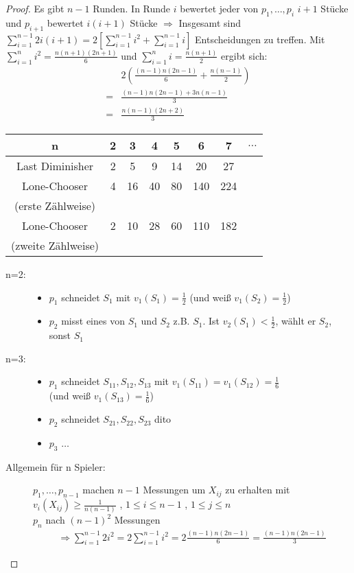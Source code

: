 \documentclass[a4paper,10pt]{scrartcl}
\begin{document}
\begin{proof}
 Es gibt $n-1$ Runden. In Runde $i$ bewertet jeder von $p_1,\ldots,p_i$ $i+1$ Stücke und $p_{i+1}$ bewertet $i(i+1)$ Stücke $\Rightarrow$
 Insgesamt sind $\sum\limits_{i=1}^{n-1}2i(i+1)=2\left[\sum\limits_{i=1}^{n-1}i^2+\sum\limits_{i=1}^{n-1}i\right]$ Entscheidungen zu treffen.
 Mit $\sum\limits_{i=1}^{n}i^2 = \frac{n(n+1)(2n+1)}{6}$ und $\sum\limits_{i=1}^{n}i=\frac{n(n+1)}{2}$ ergibt sich:
 \begin{eqnarray*}
  &2\left(\frac{(n-1)n(2n-1)}{6}+\frac{n(n-1)}{2}\right)\\
  = &\frac{(n-1)n(2n-1)+3n(n-1)}{3}\\= &\frac{n(n-1)(2n+2)}{3}
 \end{eqnarray*}
 \begin{tabular}{c|ccccccc}
  n & 2 & 3 & 4 & 5 & 6 & 7& $\ldots$\\ \hline
  Last Diminisher & 2 & 5 & 9 & 14 & 20 & 27 &\\
  Lone-Chooser & 4 & 16 & 40 & 80 & 140 & 224 &\\
  (erste Zählweise) & & & & & & &\\
  Lone-Chooser & 2 & 10 & 28 & 60 & 110 & 182 &\\
  (zweite Zählweise) & & & & & & & \\
 \end{tabular}
\begin{description}
 \item[n=2:]
  \begin{itemize}
        \item $p_1$ schneidet $S_1$ mit $v_1(S_1)=\frac{1}{2}$ (und weiß $v_1(S_2)=\frac{1}{2}$)
        \item $p_2$ misst eines von $S_1$ und $S_2$ z.B. $S_1$. Ist $v_2(S_1)<\frac{1}{2}$, wählt er $S_2$, sonst $S_1$
   \end{itemize}
  \item[n=3:]
   \begin{itemize}
    \item $p_1$ schneidet $S_{11},S_{12},S_{13}$ mit $v_1(S_{11})=v_1(S_{12})=\frac{1}{6}$\\ (und weiß $v_1(S_{13})=\frac{1}{6}$)
    \item $p_2$ schneidet $S_{21},S_{22},S_{23}$ dito
    \item $p_3$ $\ldots$
   \end{itemize}
  \item[Allgemein für n Spieler:] $p_1,\ldots,p_{n-1}$ machen $n-1$ Messungen um $X_{ij}$ zu erhalten mit $v_i(X_{ij})\geq\frac{1}{n(n-1)}$
   , $1\leq i\leq n-1$ , $1\leq j\leq n$\\$p_n$ nach $(n-1)^2$ Messungen
   \begin{align*}
    \Rightarrow  \sum\limits_{i=1}^{n-1}2i^2=2\sum\limits_{i=1}^{n-1}i^2=2\frac{(n-1)n(2n-1)}{6}=\frac{(n-1)n(2n-1)}{3}
   \end{align*}
\end{description}
\end{proof}
\end{document}
